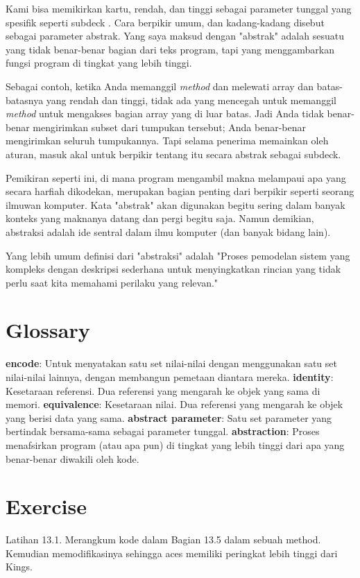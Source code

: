 \noindent Kami bisa memikirkan kartu, rendah, dan tinggi sebagai parameter tunggal yang spesifik seperti subdeck . Cara berpikir umum, dan kadang-kadang disebut sebagai parameter abstrak. Yang saya maksud dengan "abstrak" adalah sesuatu yang tidak benar-benar bagian dari teks program, tapi yang menggambarkan fungsi program di tingkat yang lebih tinggi.

\noindent Sebagai contoh, ketika Anda memanggil \textit{method} dan melewati array dan batas-batasnya yang rendah dan tinggi, tidak ada yang mencegah untuk memanggil \textit{method} untuk mengakses bagian array yang di luar batas. Jadi Anda tidak benar-benar mengirimkan subset dari tumpukan tersebut; Anda benar-benar mengirimkan seluruh tumpukannya. Tapi selama penerima memainkan oleh aturan, masuk akal untuk berpikir tentang itu secara abstrak sebagai subdeck.

\noindent Pemikiran seperti ini, di mana program mengambil makna melampaui apa yang secara harfiah dikodekan, merupakan bagian penting dari berpikir seperti seorang ilmuwan komputer. Kata "abstrak" akan digunakan begitu sering dalam banyak konteks yang maknanya datang dan pergi begitu saja. Namun demikian, abstraksi adalah ide sentral dalam ilmu komputer (dan banyak bidang lain).

\noindent Yang lebih umum definisi dari "abstraksi" adalah "Proses pemodelan sistem yang kompleks dengan deskripsi sederhana untuk menyingkatkan rincian yang tidak perlu saat kita memahami perilaku yang relevan."

\section{Glossary}
\textbf{encode}: Untuk menyatakan satu set nilai-nilai dengan menggunakan satu set nilai-nilai lainnya, dengan membangun pemetaan diantara mereka.
\textbf{identity}: Kesetaraan referensi. Dua referensi yang mengarah ke objek yang sama di memori.
\textbf{equivalence}: Kesetaraan nilai. Dua referensi yang mengarah ke objek yang berisi data yang sama.
\textbf{abstract parameter}: Satu set parameter yang bertindak bersama-sama sebagai parameter tunggal.
\textbf{abstraction}: Proses menafsirkan program (atau apa pun) di tingkat yang lebih tinggi dari apa yang benar-benar diwakili oleh kode.

\section{Exercise}
Latihan 13.1. Merangkum kode dalam Bagian 13.5 dalam sebuah method. Kemudian memodifikasinya sehingga aces memiliki peringkat lebih tinggi dari Kings.


